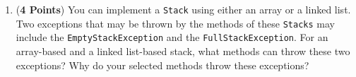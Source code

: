 \documentclass[12pt]{article}
\begin{document}
\begin{enumerate}
\begin{enumerate}
          \item ({\bf 4 Points}) You can implement a {\tt Stack} using either an array or a linked list. Two exceptions
            that may be thrown by the methods of these {\tt Stacks} may include the {\tt EmptyStackException} and
            the {\tt FullStackException}.  For an array-based and a linked list-based stack, what methods can throw
            these two exceptions?  Why do your selected methods throw these exceptions?
            

        \end{enumerate}

        \newpage







\end{enumerate}
\end{document}
